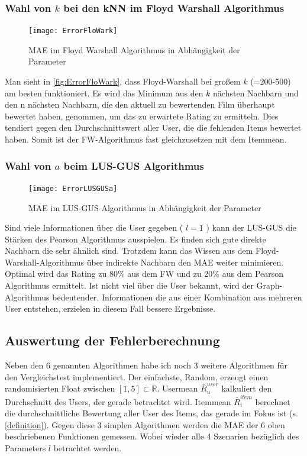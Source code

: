 \subsubsection{Wahl von $k$ bei den kNN im Floyd Warshall Algorithmus}\label{s.kflowar}
\begin{figure}[htbp!]
\centering
\texttt{[image: ErrorFloWark]}
\caption{MAE im Floyd Warshall Algorithmus in Abhängigkeit der Parameter}
\label{fig:ErrorFloWark}
\end{figure}
Man sieht in \autoref{fig:ErrorFloWark}, dass Floyd-Warshall bei großem $k$ (=200-500) am besten funktioniert. Es wird das Minimum aus den $k$ nächsten Nachbarn und den n nächsten Nachbarn, die den aktuell zu bewertenden Film überhaupt bewertet haben, genommen, um das zu erwartete Rating zu ermitteln. Dies tendiert gegen den Durchschnittswert aller User, die die fehlenden Items bewertet haben. Somit ist der FW-Algorithmus fast gleichzusetzen mit dem Itemmean.
\clearpage

\subsubsection{Wahl von $a$ beim LUS-GUS Algorithmus}\label{s.alugu}

\begin{figure}[htbp!]
\centering
\texttt{[image: ErrorLUSGUSa]}
\caption{MAE im LUS-GUS Algorithmus in Abhängigkeit der Parameter}
\label{fig:ErrorLUSGUSa}
\end{figure}
\FloatBarrier
Sind viele Informationen über die User gegeben ( $l = 1$ ) kann der LUS-GUS die Stärken des Pearson Algorithmus ausspielen. Es finden sich gute direkte Nachbarn die sehr ähnlich sind. Trotzdem kann das Wissen aus dem Floyd-Warshall-Algorithmus über indirekte Nachbarn den MAE weiter minimieren. Optimal wird das Rating zu 80\% aus dem FW und zu 20\% aus dem Pearson Algorithmus ermittelt. Ist nicht viel über die User bekannt, wird der Graph-Algorithmus bedeutender. Informationen die aus einer Kombination aus mehreren User entstehen, erzielen in diesem Fall bessere Ergebnisse.


\subsection{Auswertung der Fehlerberechnung}\label{s.auswertung}
Neben den 6 genannten Algorithmen habe ich noch 3 weitere Algorithmen für den Vergleichstest implementiert. Der einfachste, Random, erzeugt einen randomisierten Float zwischen $[1,5]\subset \mathbb{R}$. Usermean $\bar{R}^{user}_{u}$ kalkuliert den Durchschnitt des Users, der gerade betrachtet wird. Itemmean $\bar{R}^{item}_{i}$ berechnet die durchschnittliche Bewertung aller User des Items, das gerade im Fokus ist (s. \autoref{definition}). 
Gegen diese 3 simplen Algorithmen werden die MAE der 6 oben beschriebenen Funktionen gemessen. Wobei wieder alle 4 Szenarien bezüglich des Parameters $l$ betrachtet werden.\\

